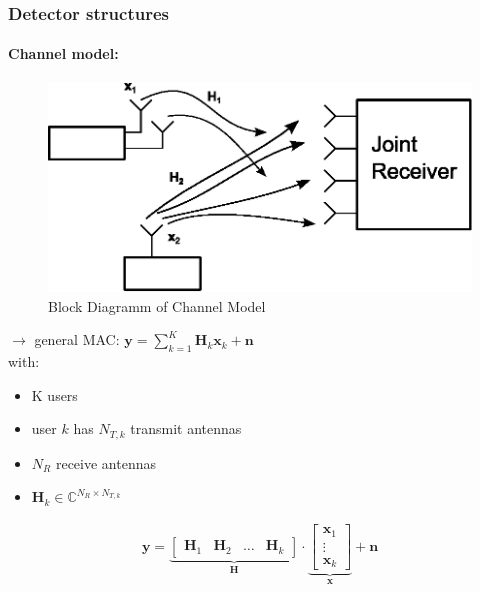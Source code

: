 \documentclass[a4paper, 10pt]{article}
\begin{document}
\subsubsection{Detector structures}
\paragraph*{Channel model:}
\begin{figure}[h]
	\centering
	\includegraphics[scale=0.8]{Detector_Structures_Channel_Model}
	\caption{Block Diagramm of Channel Model}
	\label{fig:Detector_Structures_Channel_Model}
\end{figure}
$\rightarrow  $ general MAC: $\mathbf{y} = \sum\limits_{k = 1}^{K}\mathbf{H}_k\mathbf{x}_k + \mathbf{n} $\\
with: \begin{itemize}
	\item K users
	\item user $k $ has $N_{T,k} $ transmit antennas
	\item $N_R $ receive antennas
	\item $\mathbf{H}_k \in \mathbb{C}^{N_R\times N_{T,k}} $ 
\end{itemize}
\begin{align*}
	\mathbf{y} = 
	\underbrace{
	\begin{bmatrix}\mathbf{H}_1 & \mathbf{H}_2 & \ldots & \mathbf{H}_k 	
	\end{bmatrix}
	}_{\mathbf{H}}\cdot
	\underbrace{
	\begin{bmatrix}\mathbf{x}_1 \\ \vdots \\ \mathbf{x}_k		
	\end{bmatrix}}_{\mathbf{x}} + \mathbf{n}
\end{align*}
\end{document}
